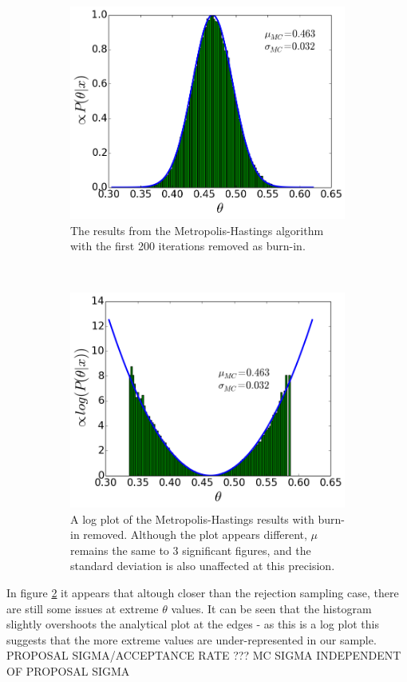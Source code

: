 \documentclass[a4paper,11pt,twoside]{article}
\begin{document}
\begin{figure}[!ht]
	\centering
	\begin{subfigure}[t]{0.4\textwidth}
		\centering
		\includegraphics[width=\textwidth]{metropolishastings-burnin.png}
		\caption{The results from the Metropolis-Hastings algorithm
		with the first 200 iterations removed as burn-in. }
		\label{fig:metropolisb}
	\end{subfigure}
	~
	\begin{subfigure}[t]{0.4\textwidth}
		\centering
		\includegraphics[width=\textwidth]{mhlog-burnin.png}
		\caption{A log plot of the Metropolis-Hastings results with
		burn-in removed. Although the plot appears different, $\mu$
		remains the same to 3 significant figures, and the standard deviation
		is also unaffected at this precision.}
		\label{fig:mhlogb}
	\end{subfigure}
	\caption{}\label{fig:mhplotsb}
\end{figure}
In figure \ref{fig:mhlogb} it appears that altough closer than the rejection
sampling case, there are still some issues at extreme $\theta$ values. It can be seen that
the histogram slightly overshoots the analytical plot at the edges - as this is a log
plot this suggests that the more extreme values are under-represented in our
sample.
PROPOSAL SIGMA/ACCEPTANCE RATE ???
MC SIGMA INDEPENDENT OF PROPOSAL SIGMA
\end{document}
